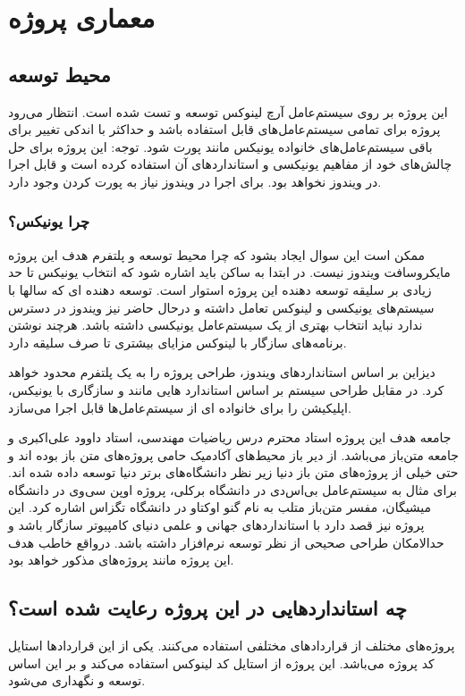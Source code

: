 \documentclass[a4paper]{report}
\begin{document}
\section{معماری پروژه}
\subsection{محیط توسعه}
این پروژه بر روی سیستم‌عامل آرچ لینوکس
توسعه و تست شده است. انتظار می‌رود پروژه برای تمامی سیستم‌عامل‌های  قابل استفاده باشد و حداکثر
با اندکی تغییر برای باقی سیستم‌عامل‌های خانواده یونیکس مانند  پورت شود.
{\large توجه:}
این پروژه برای حل چالش‌های خود از مفاهیم یونیکسی و استانداردهای آن استفاده کرده است و قابل اجرا در ویندوز نخواهد بود.
برای اجرا در ویندوز نیاز به پورت کردن وجود دارد.

\subsubsection{چرا یونیکس؟}
ممکن است این سوال ایجاد بشود که چرا محیط توسعه و پلتفرم هدف این پروژه مایکروسافت ویندوز نیست.
در ابتدا به ساکن باید اشاره شود که انتخاب یونیکس تا حد زیادی بر سلیقه توسعه دهنده این پروژه استوار است.
توسعه دهنده ای که سالها با سیستم‌های یونیکسی و لینوکس تعامل داشته و درحال حاضر نیز ویندوز در دسترس ندارد
نباید انتخاب بهتری از یک سیستم‌عامل یونیکسی داشته باشد. هرچند نوشتن برنامه‌های سازگار با لینوکس مزایای بیشتری
تا صرف سلیقه دارد.

دیزاین بر اساس استانداردهای ویندوز، طراحی پروژه را به یک پلتفرم محدود خواهد کرد. در مقابل طراحی سیستم بر اساس
استاندارد هایی مانند 
و سازگاری با یونیکس، اپلیکیشن را برای خانواده ای از سیستم‌عامل‌ها قابل اجرا می‌سازد.

جامعه هدف این پروژه استاد محترم درس ریاضیات مهندسی، استاد داوود علی‌اکبری و جامعه متن‌باز
می‌باشد. از دیر باز محیط‌های آکادمیک حامی پروژه‌های متن باز بوده اند و حتی خیلی از پروژه‌های متن باز دنیا زیر نظر دانشگاه‌های
برتر دنیا توسعه داده شده اند. برای مثال به سیستم‌عامل بی‌اس‌دی در دانشگاه برکلی، پروژه اوپن سی‌وی در دانشگاه میشیگان، 
مفسر متن‌باز متلب به نام گنو اوکتاو در دانشگاه تگزاس اشاره کرد. این پروژه نیز قصد دارد با استانداردهای جهانی و علمی دنیای
کامپیوتر سازگار باشد و حدالامکان طراحی صحیحی از نظر توسعه نرم‌افزار داشته باشد. درواقع خاطب هدف این پروژه مانند پروژه‌های
مذکور خواهد بود.

\subsection{چه استانداردهایی در این پروژه رعایت شده است؟}
پروژه‌های مختلف از قراردادهای
مختلفی استفاده می‌کنند. یکی از این قراردادها استایل کد پروژه می‌باشد. این پروژه از استایل کد لینوکس
استفاده می‌کند و بر این اساس توسعه و نگهداری می‌شود.
\end{document}
